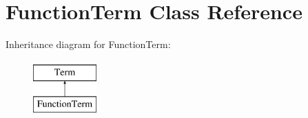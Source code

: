 \hypertarget{classFunctionTerm}{\section{\-Function\-Term \-Class \-Reference}
\label{classFunctionTerm}
}
\-Inheritance diagram for \-Function\-Term\-:\begin{figure}[H]
\begin{center}
\leavevmode
\includegraphics[height=2.000000cm]{classFunctionTerm}
\end{center}
\end{figure}

